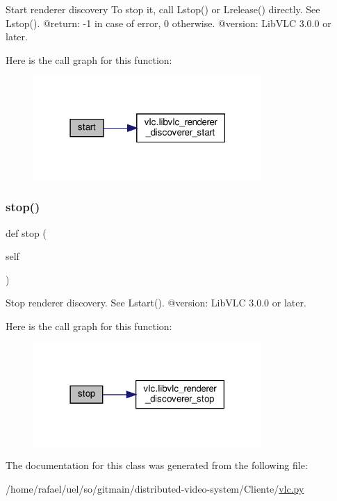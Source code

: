 \begin{DoxyVerb}Start renderer discovery
To stop it, call L{stop}() or
L{release}() directly.
See L{stop}().
@return: -1 in case of error, 0 otherwise.
@version: LibVLC 3.0.0 or later.
\end{DoxyVerb}
 Here is the call graph for this function\+:
\nopagebreak
\begin{figure}[H]
\begin{center}
\leavevmode
\includegraphics[width=247pt]{classvlc_1_1_renderer_discoverer_af1af6ddf04f00f958949618f79c33b82_cgraph}
\end{center}
\end{figure}
\mbox{\label{classvlc_1_1_renderer_discoverer_a26ca7c1c7fcdd35378e7be97727047a6}} 
\subsubsection{\texorpdfstring{stop()}{stop()}}
{\footnotesize\ttfamily def stop (\begin{DoxyParamCaption}\item[{}]{self }\end{DoxyParamCaption})}

\begin{DoxyVerb}Stop renderer discovery.
See L{start}().
@version: LibVLC 3.0.0 or later.
\end{DoxyVerb}
 Here is the call graph for this function\+:
\nopagebreak
\begin{figure}[H]
\begin{center}
\leavevmode
\includegraphics[width=246pt]{classvlc_1_1_renderer_discoverer_a26ca7c1c7fcdd35378e7be97727047a6_cgraph}
\end{center}
\end{figure}


The documentation for this class was generated from the following file\+:\begin{DoxyCompactItemize}
\item 
/home/rafael/uel/so/gitmain/distributed-\/video-\/system/\+Cliente/\hyperlink{vlc_8py}{vlc.\+py}\end{DoxyCompactItemize}
